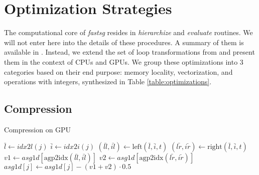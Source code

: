 \section{Optimization Strategies}
\label{sec:op_strategies}

The computational core of \textit{fastsg} resides in \textit{hierarchize} and
\textit{evaluate} routines. We will not enter here into the details of these
procedures. A summary of them is available in
\cite{Murarasu:2011:CDS:1941553.1941559}.
Instead, we extend the set of loop transformations from \cite{murarasu12fastsg:} and
present them in the context of CPUs and GPUs. We group these optimizations into
3 categories based on their end purpose: memory locality, vectorization, and
operations with integers, synthesized in Table \ref{table:optimizations}.

\subsection{Compression}

\begin{algorithm}[b]
\small{
	\caption{Compression on GPU}
 	\label{alg:hierarchization}                       

 	\begin{algorithmic}[1]
 				\State {}
 			\EndFor
 		\EndFor
	\end{algorithmic}
 
	\begin{algorithmic}[1]
	 				\State $\bar{l} \leftarrow idx2l(j)$
	 			\EndIf
	 			\State $\bar{i} \leftarrow idx2i(j)$
	 			\State $(\bar{ll}, \bar{il}) \leftarrow \text{left}(\bar{l},\bar{i}, t)$
	 			\State $(\bar{lr}, \bar{ir}) \leftarrow \text{right}(\bar{l},\bar{i}, t)$
	 			\State $v1 \leftarrow \textit{asg1d}[\text{agp2idx}(\bar{ll},\bar{il})]$ 
	 			\State $v2 \leftarrow \textit{asg1d}[\text{agp2idx}(\bar{lr},\bar{ir})]$ 
	 			\State $\textit{asg1d}[j] \leftarrow \textit{asg1d}[j] - (v1 + v2) \cdot 0.5$
			\EndFor
		\EndProcedure
	\end{algorithmic}
}
\end{algorithm}


